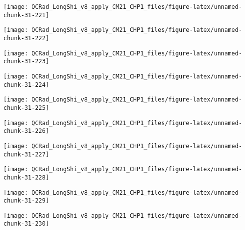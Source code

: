 \documentclass[
  10pt,
  a4paper,oneside]{article}
\begin{document}
\begin{center}\texttt{[image: QCRad\_LongShi\_v8\_apply\_CM21\_CHP1\_files/figure-latex/unnamed-chunk-31-221]} \end{center}

\begin{center}\texttt{[image: QCRad\_LongShi\_v8\_apply\_CM21\_CHP1\_files/figure-latex/unnamed-chunk-31-222]} \end{center}

\begin{center}\texttt{[image: QCRad\_LongShi\_v8\_apply\_CM21\_CHP1\_files/figure-latex/unnamed-chunk-31-223]} \end{center}

\begin{center}\texttt{[image: QCRad\_LongShi\_v8\_apply\_CM21\_CHP1\_files/figure-latex/unnamed-chunk-31-224]} \end{center}

\begin{center}\texttt{[image: QCRad\_LongShi\_v8\_apply\_CM21\_CHP1\_files/figure-latex/unnamed-chunk-31-225]} \end{center}

\begin{center}\texttt{[image: QCRad\_LongShi\_v8\_apply\_CM21\_CHP1\_files/figure-latex/unnamed-chunk-31-226]} \end{center}

\begin{center}\texttt{[image: QCRad\_LongShi\_v8\_apply\_CM21\_CHP1\_files/figure-latex/unnamed-chunk-31-227]} \end{center}

\begin{center}\texttt{[image: QCRad\_LongShi\_v8\_apply\_CM21\_CHP1\_files/figure-latex/unnamed-chunk-31-228]} \end{center}

\begin{center}\texttt{[image: QCRad\_LongShi\_v8\_apply\_CM21\_CHP1\_files/figure-latex/unnamed-chunk-31-229]} \end{center}

\begin{center}\texttt{[image: QCRad\_LongShi\_v8\_apply\_CM21\_CHP1\_files/figure-latex/unnamed-chunk-31-230]} \end{center}
\end{document}
